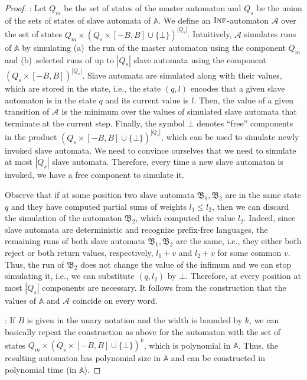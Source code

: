 \documentclass{lmcs}
\newcommand{\Paragraph}[1]{\noindent{\textbf{#1}}}
\newcommand{\nestedA}{\mathbb{A}}
\newcommand{\slaveA}{{\mathfrak{B}}}
\newcommand{\nonnestedA}{\mathcal{A}}
\newcommand{\finf}{\textsc{Inf}}
\begin{document}
\begin{proof}
\Paragraph{(1)}: Let $Q_m$ be the set of states of the master automaton and
$Q_s$ be the union of the sets of states of slave automata of $\nestedA$.
We define an $\finf$-automaton $\nonnestedA$ over the set of states $Q_m \times {(Q_s \times [-B, B] \cup \{ \bot\})}^{|Q_s|}$.
Intuitively, $\nonnestedA$ simulates runs of $\nestedA$ by simulating (a)~the run of the master automaton using the component $Q_m$
and (b)~selected runs of up to $|Q_s|$ slave automata using the component ${(Q_s \times [-B, B])}^{|Q_s|}$.
Slave automata are simulated along with their values, which are stored in the state, i.e., the state $(q, l)$ encodes
that a given slave automaton is in the state $q$ and its current value is $l$.
Then, the value of a given transition of $\nonnestedA$ is the minimum over the values of simulated slave automata
that terminate at the current step.
Finally, the symbol $\bot$ denotes ``free'' components in the product
${(Q_s \times [-B, B] \cup \{ \bot\})}^{|Q_s|}$, which can be used to simulate newly invoked slave automata.
We need to convince ourselves that we need to simulate at most $|Q_s|$ slave automata.
Therefore, every time a new slave automaton is invoked, we have a free component to simulate it.

Observe that if at some position two slave automata $\slaveA_1, \slaveA_2$ are in the same state $q$ and they have
computed partial sums of weights $l_1 \leq l_2$, then we can discard the simulation of the automaton $\slaveA_2$, which computed the value $l_2$.
Indeed, since slave automata are deterministic and recognize prefix-free languages,  the remaining runs of both slave automata
$\slaveA_1, \slaveA_2$ are the same, i.e., they either both reject or both return values, respectively,  $l_1 + v$ and $l_2 +v$ for some common $v$.
Thus, the run of $\slaveA_2$ does not change the value of the infimum and we can stop simulating it, i.e., we can substitute $(q, l_2)$ by $\bot$.
Therefore, at every position at most $|Q_s|$ components are necessary.
It follows from the construction that the values of $\nestedA$ and $\nonnestedA$ coincide on every word.

\Paragraph{(2)}: If $B$ is given in the unary notation and the width is bounded by $k$, we can basically repeat the construction as above for
the automaton with the set of states  $Q_m \times {(Q_s \times [-B, B] \cup \{ \bot\})}^{k}$, which is polynomial in $\nestedA$.
Thus, the resulting automaton has polynomial size in $\nestedA$ and can be constructed in polynomial time (in $\nestedA$).
\end{proof}
\end{document}
